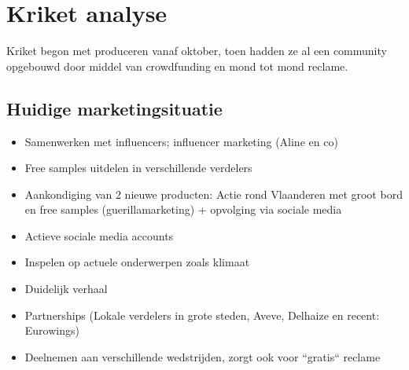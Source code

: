 
\chapter{Kriket analyse}
\label{ch:analyse}

Kriket begon met produceren vanaf oktober, toen hadden ze al een community opgebouwd door middel van crowdfunding en mond tot mond reclame.

\section{Huidige marketingsituatie}
\label{sec:huidige-marketingsituatie}
\begin{itemize} 
	\item Samenwerken met influencers; influencer marketing (Aline en co)
	\item Free samples uitdelen in verschillende verdelers
	\item Aankondiging van 2 nieuwe producten: Actie rond Vlaanderen met groot bord en free samples (guerillamarketing) + opvolging via sociale media
	\item Actieve sociale media accounts
	\item Inspelen op actuele onderwerpen zoals klimaat
	\item Duidelijk verhaal
	\item Partnerships (Lokale verdelers in grote steden, Aveve, Delhaize en recent: Eurowings)
	\item Deelnemen aan verschillende wedstrijden, zorgt ook voor ``gratis`` reclame
\end{itemize}